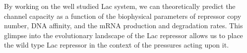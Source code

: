 

By working on the well studied Lac system, we can theoretically predict the channel capacity as a function of the biophysical parameters of repressor copy number, DNA affinity, and the mRNA production and degradation rates. This glimpse into the evolutionary landscape of the Lac repressor allows us to place the wild type Lac repressor in the context of the pressures acting upon it.


